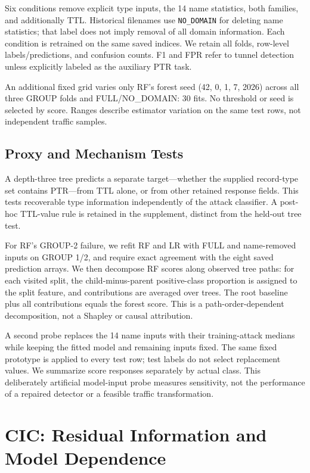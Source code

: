 \documentclass[conference]{IEEEtran}
\newcommand{\code}[1]{\texttt{#1}}
\begin{document}
Six conditions remove explicit type inputs, the 14 name statistics, both families, and additionally TTL. Historical filenames use \code{NO\_DOMAIN} for deleting name statistics; that label does not imply removal of all domain information. Each condition is retrained on the same saved indices. We retain all folds, row-level labels/predictions, and confusion counts. F1 and FPR refer to tunnel detection unless explicitly labeled as the auxiliary PTR task.

An additional fixed grid varies only RF's forest seed (42, 0, 1, 7, 2026) across all three GROUP folds and FULL/NO\_DOMAIN: 30 fits. No threshold or seed is selected by score. Ranges describe estimator variation on the same test rows, not independent traffic samples.

\subsection{Proxy and Mechanism Tests}
A depth-three tree predicts a separate target---whether the supplied record-type set contains PTR---from TTL alone, or from other retained response fields. This tests recoverable type information independently of the attack classifier. A post-hoc TTL-value rule is retained in the supplement, distinct from the held-out tree test.

For RF's GROUP-2 failure, we refit RF and LR with FULL and name-removed inputs on GROUP 1/2, and require exact agreement with the eight saved prediction arrays. We then decompose RF scores along observed tree paths: for each visited split, the child-minus-parent positive-class proportion is assigned to the split feature, and contributions are averaged over trees. The root baseline plus all contributions equals the forest score. This is a path-order-dependent decomposition, not a Shapley or causal attribution.

A second probe replaces the 14 name inputs with their training-attack medians while keeping the fitted model and remaining inputs fixed. The same fixed prototype is applied to every test row; test labels do not select replacement values. We summarize score responses separately by actual class. This deliberately artificial model-input probe measures sensitivity, not the performance of a repaired detector or a feasible traffic transformation.

\section{CIC: Residual Information and Model Dependence}
\end{document}
